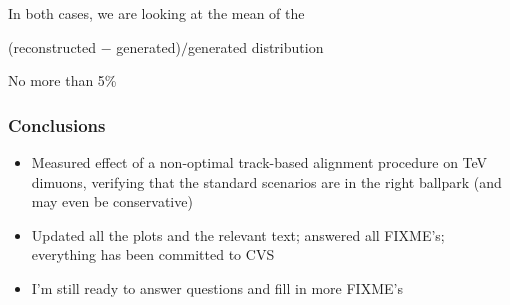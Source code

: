 \documentclass[compress]{beamer}
\begin{document}
\begin{frame}
\vspace{0.5 cm} In both cases, we are looking at the mean of the

(reconstructed $-$ generated)$/$generated distribution

\vspace{0.5 cm} No more than 5\%
\end{frame}

\begin{frame}
\frametitle{Conclusions}
\begin{itemize}\setlength{\itemsep}{0.75 cm}
\item Measured effect of a non-optimal track-based alignment procedure
on TeV dimuons, verifying that the standard scenarios are in the right
ballpark (and may even be conservative)

\item Updated all the plots and the relevant text; answered all
FIXME's; everything has been committed to CVS

\item I'm still ready to answer questions and fill in more FIXME's
\end{itemize}

\label{numpages}
\end{frame}
\end{document}
